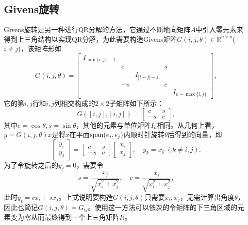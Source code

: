 \documentclass[a4paper,10pt]{ctexart}
\begin{document}
\subsection{Givens旋转}
Givens旋转是另一种进行QR分解的方法，它通过不断地向矩阵$ A $中引入零元素来得到上三角结构以实现QR分解，为此需要构造Givens矩阵$ G(i,j,\theta)\in \mathbb{R}^{n\times n} $($ i\ne j $)，该矩阵形如
\[
    G(i,j,\theta) = 
    \begin{bmatrix}
        I_{\min\{i,j\}-1} & & & &\\
        & c & & s &\\
        & & I_{|i-j|-1} & &\\
        & -s & & c & \\
        & & & & I_{n-\max\{i,j\}}
    \end{bmatrix},
\]
它的第$ i,j $行和$ i,j $列相交构成的$ 2\times 2 $子矩阵如下所示：
\[
    G([i,j], [i,j]) = 
    \begin{bmatrix}
        c & s\\
        -s & c
    \end{bmatrix},
\]
其中$ c=\cos \theta, s= \sin \theta $，其他的元素与单位矩阵$ I_n $相同。从几何上看，$ y = G(i,j,\theta)x $是将$ x $在平面$ {\rm span}(e_i,e_j) $内顺时针旋转$ \theta $后得到的向量，即
\[
    \begin{bmatrix} 
        y_i \\ y_j
    \end{bmatrix} = 
    \begin{bmatrix}
        c & s\\
        -s & c
    \end{bmatrix}
    \begin{bmatrix}
        x_i \\ x_j
    \end{bmatrix},\quad y_{k} = x_k\ (k\ne i,j).
\]
为了令旋转之后的$ y_j =0 $，需要令
\begin{equation}
    s = \frac{x_j}{\sqrt{x_i^2 + x_j^2}},\quad c = \frac{x_i}{\sqrt{x_i^2 + x_j^2}},
\end{equation}
此时$ y_i = cx_i+sx_j $。上式说明要构造$ G(i,j,\theta) $只需要$ x_i,x_j $，无需计算出角度$ \theta $，因此也简记$ G(i,j,\theta) = G_{ij} $。使用这一方法可以依次的令矩阵的下三角区域的元素变为零从而最终得到一个上三角矩阵$ R $。
\end{document}
